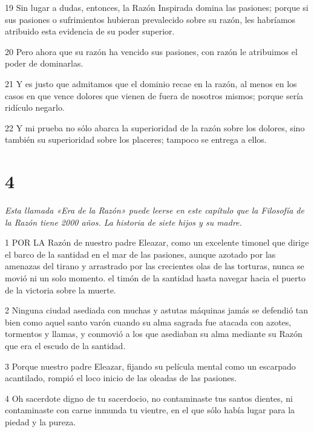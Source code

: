 \par 19 Sin lugar a dudas, entonces, la Razón Inspirada domina las pasiones; porque si sus pasiones o sufrimientos hubieran prevalecido sobre su razón, les habríamos atribuido esta evidencia de su poder superior.

\par 20 Pero ahora que su razón ha vencido sus pasiones, con razón le atribuimos el poder de dominarlas.

\par 21 Y es justo que admitamos que el dominio recae en la razón, al menos en los casos en que vence dolores que vienen de fuera de nosotros mismos; porque sería ridículo negarlo.

\par 22 Y mi prueba no sólo abarca la superioridad de la razón sobre los dolores, sino también su superioridad sobre los placeres; tampoco se entrega a ellos.

\chapter{4}

\par \textit{Esta llamada «Era de la Razón» puede leerse en este capítulo que la Filosofía de la Razón tiene 2000 años. La historia de siete hijos y su madre.}

\par 1 POR LA Razón de nuestro padre Eleazar, como un excelente timonel que dirige el barco de la santidad en el mar de las pasiones, aunque azotado por las amenazas del tirano y arrastrado por las crecientes olas de las torturas, nunca se movió ni un solo momento. el timón de la santidad hasta navegar hacia el puerto de la victoria sobre la muerte.

\par 2 Ninguna ciudad asediada con muchas y astutas máquinas jamás se defendió tan bien como aquel santo varón cuando su alma sagrada fue atacada con azotes, tormentos y llamas, y conmovió a los que asediaban su alma mediante su Razón que era el escudo de la santidad.

\par 3 Porque nuestro padre Eleazar, fijando su película mental como un escarpado acantilado, rompió el loco inicio de las oleadas de las pasiones.

\par 4 Oh sacerdote digno de tu sacerdocio, no contaminaste tus santos dientes, ni contaminaste con carne inmunda tu vientre, en el que sólo había lugar para la piedad y la pureza.

